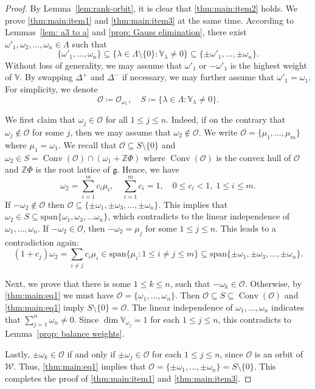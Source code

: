 \documentclass[11pt,reqno]{amsart}
\DeclareMathOperator{\Conv}{Conv}
\newcommand{\spn}{\mathrm{span}}
\newcommand{\W}{\mathcal{W}}
\begin{document}
\begin{proof}
By Lemma~\ref{lem:rank-orbit},  it is clear that \eqref{thm:main:item2} holds.  We prove \eqref{thm:main:item1} and \eqref{thm:main:item3} at the same time.  According to Lemmas~\ref{lem: a3 to a} and \ref{prop: Gauss elimination},  there exist $\omega'_1, \omega_2,  \dots,  \omega_n \in \Lambda$ such that 
\begin{equation}\label{thm:main:eq1}
\{\omega'_1,\dots,  \omega_n\} \subseteq 
\{\lambda\in \Lambda\setminus \{0\}: \mathbb{V}_{\lambda} \ne 0\}
\subseteq 
\{\pm \omega'_1,\dots,  \pm \omega_n\}. 
\end{equation}
Without loss of generality,  we may assume that $\omega'_1$ or $-\omega'_1$ is the highest weight of $\mathbb{V}$.  By swapping $\Delta^+$ and $\Delta^-$ if necessary,  we may further assume that $\omega'_1 = \omega_1$.  For simplicity,  we denote 
\[
\mathcal{O} \coloneqq \mathcal{O}_{\omega_1},\quad S \coloneqq \{\lambda\in \Lambda: \mathbb{V}_{\lambda} \ne 0\}.
\] 

We first claim that $\omega_j \in \mathcal{O}$ for all $1 \le j \le n$.  Indeed,  if on the contrary that $\omega_j \not\in \mathcal{O}$ for some $j$,  then we may assume that $\omega_2 \not\in \mathcal{O}$.  We write $\mathcal{O} = \{ \mu_1,\dots,  \mu_m \}$ where $\mu_1 = \omega_1$.  We recall that $\mathcal{O} \subseteq S \setminus \{0\}$ and $\omega_2 \in S = \Conv( \mathcal{O} ) \cap \left( \omega_1 + \mathbb{Z} \Phi \right)$ where $\Conv( \mathcal{O} )$ is the convex hull of $\mathcal{O}$ and $ \mathbb{Z} \Phi$ is the root lattice of $\mathfrak{g}$.  Hence,  we have 
\[
\omega_2 = \sum_{i=1}^{m} c_i \mu_i,  \quad \sum_{i=1}^{m} c_i = 1, \quad   0 \leq c_i < 1, \; 1 \le i \le m.
\]
If $- \omega_2 \notin \mathcal{O}$ then $\mathcal{O} \subseteq \{\pm \omega_1, \pm \omega_3,  \dots,  \pm \omega_n\}$.  This implies that $\omega_2 \in S \subseteq  \spn\{ \omega_1, \omega_3,\dots \omega_n\}$,  which contradicts to the linear independence of $\omega_1,\dots,  \omega_n$.  If $- \omega_2 \in \mathcal{O}$,  then $-\omega_2 = \mu_j$ for some $1 \le j  \le n$.  This leads to a contradiction again:
\[
(1+c_j) \omega_2 = \sum_{i \ne j} c_i \mu_i \in  \spn\{ \mu_i:  1\le i \ne j \le m\} \subseteq \spn\{\pm \omega_1, \pm \omega_3,  \dots,  \pm \omega_n\}.
\]

Next,  we prove that there is some $1 \le k \le n$,  such that $-\omega_k \in \mathcal{O}$.  Otherwise,  by \eqref{thm:main:eq1} we must have $\mathcal{O} = \{\omega_1,\dots,  \omega_n\}$.  Then $\mathcal{O}  \subseteq S  \subseteq \Conv( \mathcal{O} )$ and \eqref{thm:main:eq1} imply $S \setminus \{0\} = \mathcal{O}$.  The linear independence of $\omega_1,\dots,  \omega_n$ indicates that $\sum_{j=1}^n \omega_n \ne 0$.  Since $\dim \mathbb{V}_{\omega_j} = 1$ for each $1 \le j \le n$,  this contradicts to Lemma~\ref{prop: balance weights}.

Lastly,  $\pm \omega_k \in \mathcal{O}$ if and only if $\pm \omega_j \in \mathcal{O}$ for each $1 \le j \le n$,  since $ \mathcal{O}$ is an orbit of $\W$.  Thus,  \eqref{thm:main:eq1} implies that $\mathcal{O} = \{\pm \omega_1,\dots,  \pm \omega_n\} = S \setminus \{0\}$.  This completes the proof of \eqref{thm:main:item1} and \eqref{thm:main:item3}.
\end{proof}
\end{document}
